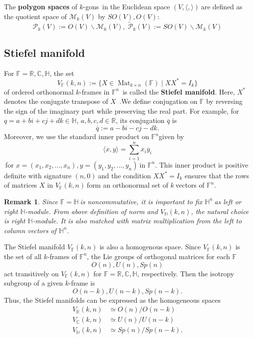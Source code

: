 \documentclass[a4paper]{article}%
\newtheorem{remark}[theorem]{Remark}
\begin{document}
The \textbf{polygon spaces} of $k$-gons\ in the Euclidean space $(V,\langle
,\rangle)\ $are defined as the quotient space of $\mathcal{M}_{k}(V)$ by
$SO(V),O(V)$:
\[
\mathcal{P}_{k}(V):=O(V)\backslash\mathcal{M}_{k}(V),\;\mathcal{\tilde{P}}%
_{k}(V):=SO(V)\backslash\mathcal{M}_{k}(V)
\]


\bigskip

\subsection{Stiefel manifold}

For $\mathbb{F}=\mathbb{R},\mathbb{C},\mathbb{H}$, the set
\[
V_{\mathbb{F}}(k,n):=\{X\in\operatorname{Mat}_{k\times n}(\mathbb{F})\mid
XX^{\ast}=I_{k}\}
\]
of ordered orthonormal $k$-frames in $\mathbb{F}^{n}$\ is called the
\textbf{Stiefel manifold}. Here, $X^{\ast}$ denotes the conjugate transpose of
$X$\ .We define conjugation on $\mathbb{F}$ by reversing the sign of the
imaginary part while preserving the real part. For example, for
$q=a+bi+cj+dk\in\mathbb{H}$, $a,b,c,d\in\mathbb{R}$, its conjugation
$\overline{q}$ is%
\[
\overline{q}:=a-bi-cj-dk.
\]
Moreover, we use the standard inner product on $\mathbb{F}^{n}$given by%
\[
\langle x,y\rangle=\sum_{i=1}^{n}x_{i}\overline{y}_{i}%
\]
$\ $for $x=\left(  x_{1},x_{2},...,x_{n}\right)  ,y=\left(  y_{1}%
,y_{2},...,y_{n}\right)  \ $in $\mathbb{F}^{n}$. This inner product is
positive definite with signature $(n,0)\ $and the condition $XX^{\ast}=I_{k}$
ensures that the rows of matrices $X$ in $V_{\mathbb{F}}(k,n)\ $form an
orthonormal set of $k\ $vectors of $\mathbb{F}^{n}$.

\begin{remark}
Since $\mathbb{F}=\mathbb{H\ }$is noncommutative, it is important to fix
$\mathbb{H}^{n}\ $as left or right $\mathbb{H}$-module. From above definition
of norm and $V_{\mathbb{H}}(k,n)$, the natural choice is right $\mathbb{H}%
$-module. It is also matched with matrix multiplication from the left to
column vectors of $\mathbb{H}^{n}$.
\end{remark}

The Stiefel manifold $V_{\mathbb{F}}(k,n)$ is also a homogenous space. Since
$V_{\mathbb{F}}(k,n)$ is the set of all $k$-frames of $\mathbb{F}^{n}$, the
Lie groups of orthogonal matrices for each $\mathbb{F}$
\[
O(n),U(n),Sp(n)
\]
act transitively on $V_{\mathbb{F}}(k,n)$ for $\mathbb{F}=\mathbb{R}%
,\mathbb{C},\mathbb{H}$, respectively. Then the isotropy subgroup of a given
$k$-frame is
\[
O(n-k),U(n-k),Sp(n-k).
\]
Thus, the Stiefel manifolds can be expressed as the homogeneous spaces%
\begin{align*}
V_{\mathbb{R}}(k,n)  &  \simeq O(n)/O(n-k)\\
V_{\mathbb{C}}(k,n)  &  \simeq U(n)/U(n-k)\\
V_{\mathbb{H}}(k,n)  &  \simeq Sp(n)/Sp(n-k).
\end{align*}
\end{document}
